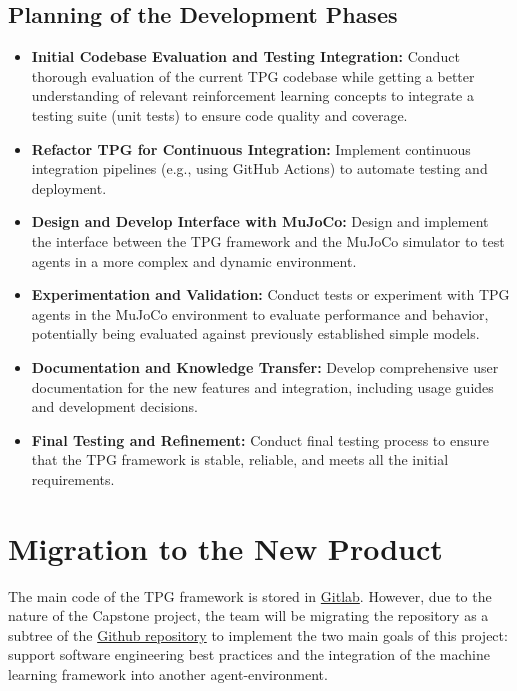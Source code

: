 \documentclass[12pt]{article}
\begin{document}
\subsection{Planning of the Development Phases}
\begin{itemize}

  \item \textbf{Initial Codebase Evaluation and Testing Integration:} Conduct thorough evaluation of the current TPG codebase while getting a better understanding of relevant reinforcement learning concepts to integrate a testing suite (unit tests) to ensure code quality and coverage.
  \item \textbf{Refactor TPG for Continuous Integration:}  Implement continuous integration pipelines (e.g., using GitHub Actions) to automate testing and deployment.
  \item \textbf{Design and Develop Interface with MuJoCo:} Design and implement the interface between the TPG framework and the MuJoCo simulator to test agents in a more complex and dynamic environment.
  \item \textbf{Experimentation and Validation:} Conduct tests or experiment with TPG agents in the MuJoCo environment to evaluate performance and behavior, potentially being evaluated against previously established simple models.
  \item \textbf{Documentation and Knowledge Transfer:} Develop comprehensive user documentation for the new features and integration, including usage guides and development decisions.
  \item \textbf{Final Testing and Refinement:} Conduct final testing process  to ensure that the TPG framework is stable, reliable, and meets all the initial requirements.

\end{itemize}

\section{Migration to the New Product}
The main code of the TPG framework is stored in \href{https://gitlab.cas.mcmaster.ca/kellys32/tpg}{Gitlab}. However, due to the nature of the Capstone project, the team will be migrating the repository as a subtree of the \href{https://github.com/TPGEngine/tpg}{Github repository} to implement the two main goals of this project: support software engineering best practices and the integration of the machine learning framework into another agent-environment. 
\end{document}
